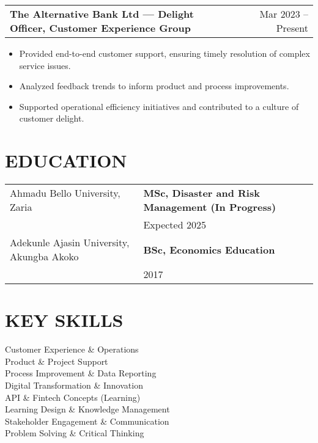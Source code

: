 \documentclass[a4paper,12pt]{article}
\makeatletter
\newenvironment{joblong}[2]
    {
    \begin{tabularx}{\linewidth}{@{}l X r@{}}
    \textbf{#1} & \hfill &  #2 \\[3.75pt]
    \end{tabularx}
    \begin{minipage}[t]{\linewidth}
    \begin{itemize}[nosep,after=\strut,leftmargin=1em,itemsep=3pt,label=--]
    }
    {
    \end{itemize}
    \end{minipage}
    }
\makeatother
\begin{document}
\begin{joblong}{The Alternative Bank Ltd — Delight Officer, Customer Experience Group}{Mar 2023 -- Present}
\item Provided end-to-end customer support, ensuring timely resolution of complex service issues.
\item Analyzed feedback trends to inform product and process improvements.
\item Supported operational efficiency initiatives and contributed to a culture of customer delight.
\end{joblong}


\section{EDUCATION}

\begin{tabularx}{\linewidth}{@{}l X@{}}
Ahmadu Bello University, Zaria & \textbf{MSc, Disaster and Risk Management (In Progress)} \\
                               & Expected 2025 \\[10pt]
Adekunle Ajasin University, Akungba Akoko & \textbf{BSc, Economics Education} \\
                               & 2017 \\[10pt]
\end{tabularx}


\section{KEY SKILLS}

Customer Experience \& Operations \\
Product \& Project Support \\
Process Improvement \& Data Reporting \\
Digital Transformation \& Innovation \\
API \& Fintech Concepts (Learning) \\
Learning Design \& Knowledge Management \\
Stakeholder Engagement \& Communication \\
Problem Solving \& Critical Thinking
\end{document}
